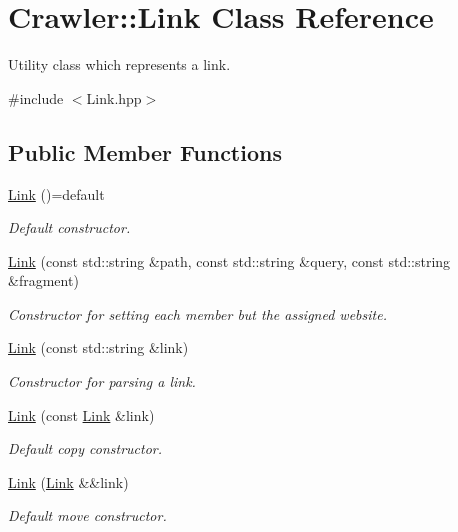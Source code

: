 \hypertarget{class_crawler_1_1_link}{}\section{Crawler\+:\+:Link Class Reference}
\label{class_crawler_1_1_link}


Utility class which represents a link.  




{\ttfamily \#include $<$Link.\+hpp$>$}

\subsection*{Public Member Functions}
\begin{DoxyCompactItemize}
\item 
\hyperlink{class_crawler_1_1_link_aa573a7b693717b4968e5461eae1d0d9d}{Link} ()=default
\begin{DoxyCompactList}\small\item\em Default constructor. \end{DoxyCompactList}\item 
\hyperlink{class_crawler_1_1_link_afe281adb9739ced6e0431b9dd52e99fb}{Link} (const std\+::string \&path, const std\+::string \&query, const std\+::string \&fragment)
\begin{DoxyCompactList}\small\item\em Constructor for setting each member but the assigned website. \end{DoxyCompactList}\item 
\hyperlink{class_crawler_1_1_link_a89b684575312068544a65ecc99bca246}{Link} (const std\+::string \&link)
\begin{DoxyCompactList}\small\item\em Constructor for parsing a link. \end{DoxyCompactList}\item 
\hyperlink{class_crawler_1_1_link_a4616811d7557fdd6e572191217a7c6b3}{Link} (const \hyperlink{class_crawler_1_1_link}{Link} \&link)
\begin{DoxyCompactList}\small\item\em Default copy constructor. \end{DoxyCompactList}\item 
\hyperlink{class_crawler_1_1_link_a77a8ec7a710ca721bfaba618c15ea900}{Link} (\hyperlink{class_crawler_1_1_link}{Link} \&\&link)
\begin{DoxyCompactList}\small\item\em Default move constructor. \end{DoxyCompactList}\item 

\end{DoxyCompactItemize}
